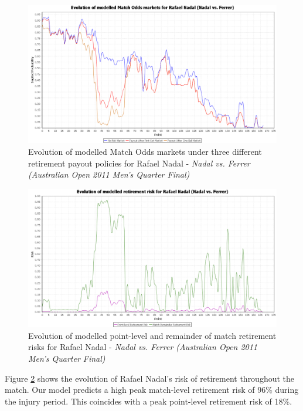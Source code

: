 \documentclass[letterpaper,12pt]{article}
\begin{document}
\begin{figure}[H]
  \centering \includegraphics[width=12.3cm]{matches/nadalferrermodel}
  \caption{Evolution of modelled Match Odds markets under three different retirement payout policies for Rafael Nadal - \textit{Nadal vs. Ferrer (Australian Open 2011 Men's Quarter Final)}}
  \label{nadalferrermodel}
\end{figure}

\begin{figure}[H]
  \centering \includegraphics[width=12.3cm]{matches/nadalferrerrisk}
  \caption{Evolution of modelled point-level and remainder of match retirement risks for Rafael Nadal - \textit{Nadal vs. Ferrer (Australian Open 2011 Men's Quarter Final)}}
  \label{nadalferrerrisk}
\end{figure}

Figure \ref{nadalferrerrisk} shows the evolution of Rafael Nadal's risk of retirement throughout the match.  Our model predicts a high peak match-level retirement risk of 96\% during the injury period.  This coincides with a peak point-level retirement risk of 18\%.
\end{document}
